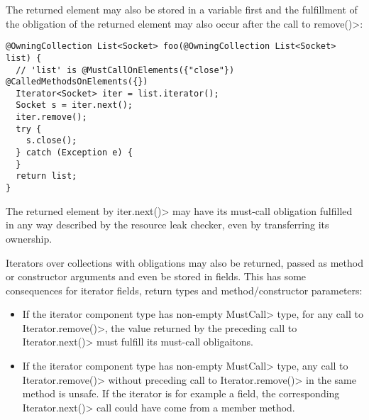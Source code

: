 The returned element may also be stored in a variable first and the fulfillment of the obligation of the returned element may also occur after the call to \<remove()>:

\begin{verbatim}
@OwningCollection List<Socket> foo(@OwningCollection List<Socket> list) {
  // 'list' is @MustCallOnElements({"close"}) @CalledMethodsOnElements({})
  Iterator<Socket> iter = list.iterator();
  Socket s = iter.next();
  iter.remove();
  try {
    s.close();
  } catch (Exception e) {
  }
  return list;
}
\end{verbatim}

The returned element by \<iter.next()> may have its must-call obligation fulfilled in any way described by the resource leak checker, even by transferring its ownership.

Iterators over collections with obligations may also be returned, passed as method or constructor arguments and even be stored in fields. This has some consequences for iterator fields, return types and method/constructor parameters:
\begin{itemize}
  \item If the iterator component type has non-empty \<MustCall> type, for any call to \<Iterator.remove()>, the value returned by the preceding call to \<Iterator.next()> must fulfill its must-call obligaitons.
  \item If the iterator component type has non-empty \<MustCall> type, any call to \<Iterator.remove()> without preceding call to \<Iterator.remove()> in the same method is unsafe. If the iterator is for example a field, the corresponding \<Iterator.next()> call could have come from a member method.
\end{itemize}




